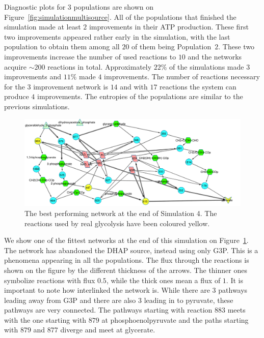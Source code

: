 \documentclass[a4paper,12pt]{article}
\begin{document}
Diagnostic plots for $3$ populations are shown on Figure~\ref{fig:simulationmultisource}. All of the populations that finished the simulation made at least $2$ improvements in their ATP production. These first two improvements appeared rather early in the simulation, with the last population to obtain them among all $20$ of them being Population~$2$. These two improvements increase the number of used reactions to $10$ and the networks acquire $\sim 200$ reactions in total. Approximately $22\%$ of the simulations made $3$ improvements and $11\%$ made $4$ improvements. The number of reactions necessary for the $3$ improvement network is $14$ and with $17$ reactions the system can produce $4$ improvements. The entropies of the populations are similar to the previous simulations. 



\begin{figure}[htpb]
	\centering
	\includegraphics[width=1\linewidth]{multisink_finalnet.pdf}
	\caption{The best performing network at the end of Simulation 4. The reactions used by real glycolysis have been coloured yellow. }
	\label{fig:multi}
\end{figure}

We show one of the fittest networks at the end of this simulation on Figure~\ref{fig:multi}. The network has abandoned the DHAP source, instead using only G3P. This is a phenomena appearing in all the populations. The flux through the reactions is shown on the figure by the different thickness of the arrows. The thinner ones symbolize reactions with flux $0.5$, while the thick ones mean a flux of $1$. It is important to note how interlinked the network is. While there are 3 pathways leading away from G3P and there are also $3$ leading in to pyruvate, these pathways are very connected. The pathways starting with reaction $883$ meets with the one starting with $879$ at phosphoenolpyruvate and the paths starting with $879$ and $877$ diverge and meet at glycerate. 
\end{document}
